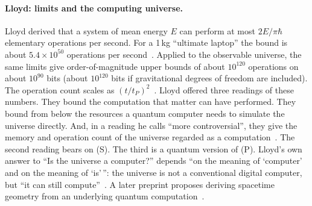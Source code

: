 \paragraph{Lloyd: limits and the computing universe.} Lloyd derived that a
system of mean energy $E$ can perform at most $2E/\pi\hbar$ elementary
operations per second. For a 1\,kg ``ultimate laptop'' the bound is about
$5.4\times10^{50}$ operations per second~\cite{Lloyd2000ultimate}. Applied to
the observable universe, the same limits give order-of-magnitude upper bounds
of about $10^{120}$ operations on about $10^{90}$ bits (about $10^{120}$ bits if
gravitational degrees of freedom are included). The operation count scales as
$(t/t_P)^2$~\cite{Lloyd2002computational}. Lloyd offered three readings of
these numbers. They bound the computation that matter can have performed. They
bound from below the resources a quantum computer needs to simulate the
universe directly. And, in a reading he calls ``more controversial'', they give
the memory and operation count of the universe regarded as a
computation~\cite{Lloyd2002computational}. The second reading bears on (S).
The third is a quantum version of (P). Lloyd's own answer to ``Is the universe
a computer?'' depends ``on the meaning of `computer' and on the meaning of
`is'\,'': the universe is not a conventional digital computer, but ``it can
still compute''~\cite{Lloyd2002computational}. A later preprint proposes
deriving spacetime geometry from an underlying quantum
computation~\cite{Lloyd2005theory}.

